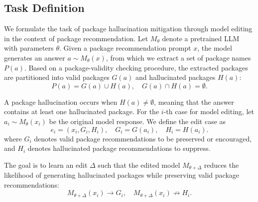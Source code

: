

\subsection{Task Definition}
We formulate the task of package hallucination mitigation through model editing in the context of package recommendation. 
Let $M_{\theta}$ denote a pretrained LLM with parameters $\theta$. Given a package recommendation prompt $x$, the model generates an answer $a \sim M_{\theta}(x)$, from which we extract a set of package names $P(a)$. Based on a package-validity checking procedure, the extracted packages are partitioned into valid packages $G(a)$ and hallucinated packages $H(a)$:
\begin{equation}
    P(a) = G(a) \cup H(a), \quad G(a) \cap H(a) = \emptyset .
\end{equation}



A package hallucination occurs when $H(a)\neq\emptyset$, meaning that the answer contains at least one hallucinated package. 
For the $i$-th case for model editing, let $a_i \sim M_{\theta}(x_i)$ be the original model response. 
We define the edit case as
\begin{equation}
    e_i = (x_i, G_i, H_i),
    \quad
    G_i = G(a_i),
    \quad
    H_i = H(a_i).
\end{equation}
where $G_i$ denotes valid package recommendations to be preserved or encouraged, and $H_i$ denotes hallucinated package recommendations to suppress.

The goal is to learn an edit $\Delta$ such that the edited model $M_{\theta+\Delta}$ reduces the likelihood of generating hallucinated packages while preserving valid package recommendations:
\begin{equation}
    M_{\theta+\Delta}(x_i) \rightarrow G_i,\quad
    M_{\theta+\Delta}(x_i) \not\rightarrow H_i.
\end{equation}

